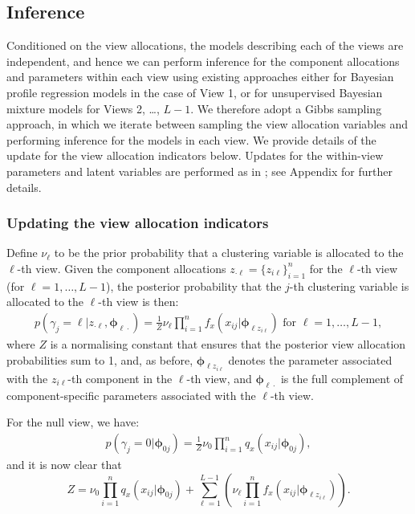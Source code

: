 \documentclass[12pt]{article}
\begin{document}
\subsection{Inference}
Conditioned on the view allocations, the models describing each of the views are independent, and hence we can perform inference for the component allocations and parameters within each view using existing approaches either for Bayesian profile regression models \citep{Molitor2010} in the case of View 1, or for unsupervised Bayesian mixture models \citep[e.g.][]{Richardson1997,Neal2000} for Views 2, \ldots, $L-1$.  We therefore adopt a Gibbs sampling approach, in which we iterate between sampling the view allocation variables and performing inference for the models in each view.  We provide details of the update for the view allocation indicators below.  Updates for the within-view parameters and latent variables are performed as in \citet{Neal2000}; see  Appendix for further details.

\subsubsection{Updating the view allocation indicators}  
Define $\nu_{\ell}$ to be the prior probability that a clustering variable is allocated to the $\ell$-th view.  Given the component allocations $z_{\cdot\ell} = \{z_{i\ell} \}_{i = 1}^n$ for the $\ell$-th view (for $\ell = 1, \ldots, L-1$), the posterior probability that the $j$-th clustering variable is allocated to the $\ell$-th view is then:
\begin{align}
p(\gamma_j = \ell | z_{\cdot\ell}, \boldsymbol{\phi}_{\ell \cdot} ) = \frac{1}{Z} \nu_{\ell} \prod_{i = 1}^n f_x(x_{ij} | \boldsymbol{\phi}_{\ell z_{i\ell}}) \mbox{ for $\ell = 1, \ldots, L-1$},
\end{align}
where $Z$ is a normalising constant that ensures that the posterior view allocation probabilities sum to 1, and, as before, $\boldsymbol{\phi}_{\ell z_{i\ell}}$ denotes the parameter associated with the $z_{i\ell}$-th component in the $\ell$-th view, and $\boldsymbol{\phi}_{\ell \cdot}$ is the full complement of component-specific parameters associated with the $\ell$-th view.

For the null view, we have:
\begin{align}
p(\gamma_j = 0|  \boldsymbol{\phi}_{0 j} ) = \frac{1}{Z}  \nu_{0} \prod_{i = 1}^n q_x(x_{ij} | \boldsymbol{\phi}_{0j}),
\end{align}
and it is now clear that $$Z = \nu_{0} \prod_{i = 1}^n q_x(x_{ij} | \boldsymbol{\phi}_{0j}) + \sum_{\ell = 1}^{L-1}\left( \nu_{\ell} \prod_{i = 1}^n f_x(x_{ij} | \boldsymbol{\phi}_{\ell z_{i\ell}})\right).$$
\end{document}
